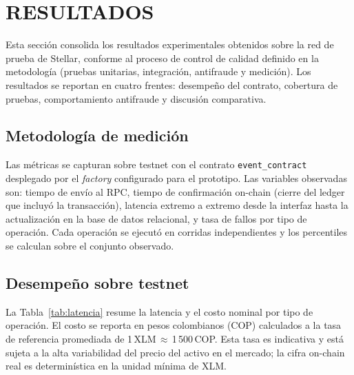 \newpage
\section{RESULTADOS}

Esta sección consolida los resultados experimentales obtenidos sobre la red de prueba de Stellar, conforme al
proceso de control de calidad definido en la metodología (pruebas unitarias, integración, antifraude y
medición). Los resultados se reportan en cuatro frentes: desempeño del contrato, cobertura de pruebas,
comportamiento antifraude y discusión comparativa.

\subsection{Metodología de medición}

Las métricas se capturan sobre testnet con el contrato \texttt{event\_contract} desplegado por el
\textit{factory} configurado para el prototipo. Las variables observadas son: tiempo de envío al RPC, tiempo
de confirmación on-chain (cierre del ledger que incluyó la transacción), latencia extremo a extremo desde la
interfaz hasta la actualización en la base de datos relacional, y tasa de fallos por tipo de operación. Cada
operación se ejecutó en corridas independientes y los percentiles se calculan sobre el conjunto observado.

\subsection{Desempeño sobre testnet}

La Tabla~\ref{tab:latencia} resume la latencia y el costo nominal por tipo de operación. El costo se reporta
en pesos colombianos (COP) calculados a la tasa de referencia promediada de 1\,XLM\,$\approx$\,1\,500\,COP.
Esta tasa es indicativa y está sujeta a la alta variabilidad del precio del activo en el mercado; la cifra
on-chain real es determinística en la unidad mínima de XLM.

